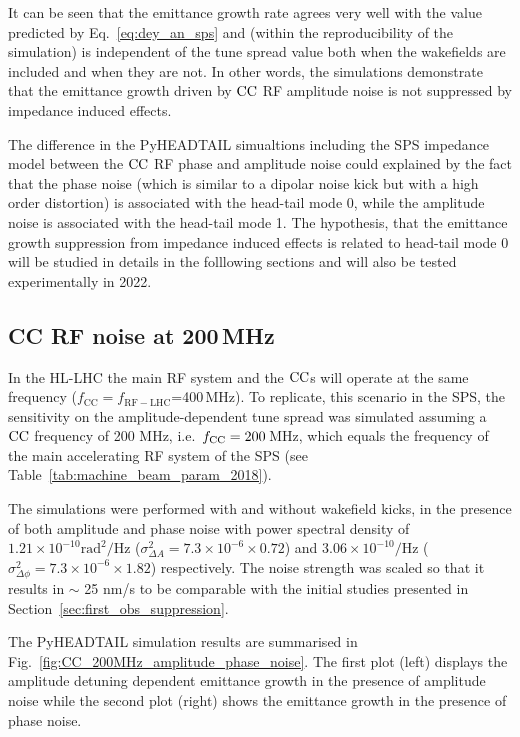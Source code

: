  It can be seen that the emittance growth rate agrees very well with the value predicted by Eq.~\eqref{eq:dey_an_sps} and (within the reproducibility of the simulation) is independent of the tune spread value both when the wakefields are included and when they are not. In other words, the simulations demonstrate that the emittance growth driven by ${\mathrm{CC}}$ RF amplitude noise is not suppressed by impedance induced effects. 

 The difference in the PyHEADTAIL simualtions including the SPS impedance model between the ${\mathrm{CC}}$ RF phase and amplitude noise could explained by the fact that the phase noise (which is similar to a dipolar noise kick but with a high order distortion) is associated with the head-tail mode 0, while the amplitude noise is associated with the head-tail mode 1. The hypothesis, that the emittance growth suppression from impedance induced effects is related to head-tail mode 0 will be studied in details in the folllowing sections and will also be tested experimentally in 2022.


\subsection{CC RF noise at 200\,MHz}\label{subsec:fcc_200MHz}
In the HL-LHC the main RF system and the ${\mathrm{CC}}$s will operate at the same frequency ($f_\mathrm{CC}=f_\mathrm{RF-LHC}$=400\,MHz). To replicate, this scenario in the SPS, the sensitivity on the amplitude-dependent tune spread was simulated assuming a ${\mathrm{CC}}$ frequency of 200 MHz, i.e.~${f_\mathrm{CC}}=200$\,MHz, which equals the frequency of the main accelerating RF system of the SPS (see Table~\ref{tab:machine_beam_param_2018}). 

The simulations were performed with and without wakefield kicks, in the presence of both amplitude and phase noise with power spectral density of $1.21 \times 10^{-10} \mathrm{rad^2/Hz}$ ($\sigma_{\Delta A}^2=7.3 \times 10^{-6} \times 0.72$) and $3.06 \times 10^{-10} \mathrm{/Hz}$ ($\sigma_{\Delta \phi}^2=7.3 \times 10^{-6} \times 1.82$) respectively. The noise strength was scaled so that it results in $\sim$ 25 nm/s to be comparable with the initial studies presented in Section~\ref{sec:first_obs_suppression}.

The PyHEADTAIL simulation results are summarised in Fig.~\ref{fig:CC_200MHz_amplitude_phase_noise}. The first plot (left) displays the amplitude detuning dependent emittance growth in the presence of amplitude noise while the second plot (right) shows the emittance growth in the presence of phase noise. 

